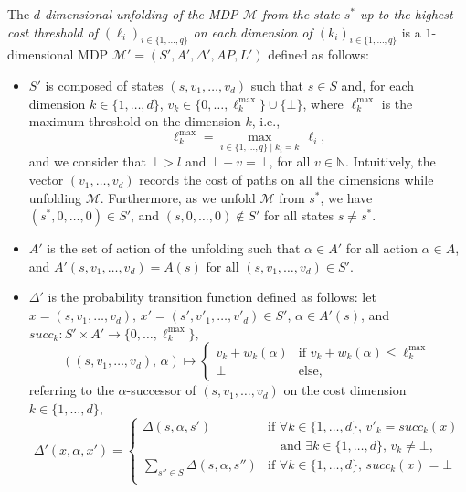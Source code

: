 \begin{definition}
The \textit{$d$-dimensional unfolding of the MDP $\mathcal{M}$ from the state $s^*$
up to the highest cost threshold of $(\ell_i)_{i \in \{1, \dots, q\}}$ on each dimension of $(k_i)_{i \in \{1, \dots, q\}}$} is a $1$-dimensional MDP \sloppy $\mathcal{M}' = {(S', A', \Delta', AP, L')}$ defined as follows:
  \begin{itemize}
    \item $S'$ is composed of states $(s, v_1, \dots, v_d)$ such that $s \in S$ and, for each dimension $k \in \{1, \dots, d\}$, $v_k \in \{0, \dots, \ell^{\max}_k\} \cup \{\bot\}$, where $\ell^{\max}_k$ is the maximum threshold on the dimension $k$, i.e., \[\ell^{\max}_k = \max_{i \in \{1, \dots, q\} \; | \; k_i = k }  \, \ell_i,\]
    and we consider that $\bot > l$
    and $\bot + v = \bot$, for all $v \in \mathbb{N}$.
    Intuitively, the vector $(v_1, \dots, v_d)$ records the cost of paths on all the dimensions while unfolding $\mathcal{M}$.
    Furthermore, as we unfold $\mathcal{M}$ from $s^*$, we have
    $(s^*, 0, \dots, 0) \in S'$, and $(s, 0, \dots, 0) \not\in S'$ for all states $s \neq s^*$.
    \item $A'$ is the set of action of the unfolding such that $\alpha \in A'$
    for all action $\alpha \in A$, and
    $A'(s, v_1, \dots, v_d) = A(s)$
    for all $(s, v_1, \dots, v_d) \in S'$.
    \item $\Delta'$ is the probability transition function defined as follows: let $x = (s, v_1, \dots, v_d) , \, x'=(s', v'_1, \dots, v'_d) \in S'$, $\alpha \in A'(s)$,
    and
    $succ_k: S' \times A' \rightarrow \{0, \dots, \ell^{\max}_k\},$
    \[((s, v_1, \dots, v_d), \, \alpha) \mapsto \begin{cases}
      v_k + w_k(\alpha) & \text{if } v_k + w_k(\alpha) \leq \ell^{\max}_k \\
      \bot & \text{else},
    \end{cases}\]
    referring to the $\alpha$-successor of $(s, v_1, \dots, v_d)$ on the cost dimension $k \in \{1, \dots, d\}$,
    \[
    \Delta'(x, \alpha, x') = \begin{cases}
      \Delta(s, \alpha, s') & \text{if } \forall k \in \{1, \dots, d\}, \, v'_k = succ_k(x) \\
      & \quad \text{and }\exists k \in \{1, \dots, d\}, \, v_k \neq \bot, \\
      \sum_{s'' \in S} \Delta(s, \alpha, s'')
      & \text{if } \forall k \in \{1, \dots, d\},\, succ_k(x) = \bot \\

\end{cases}\]
\end{itemize}
\end{definition}
